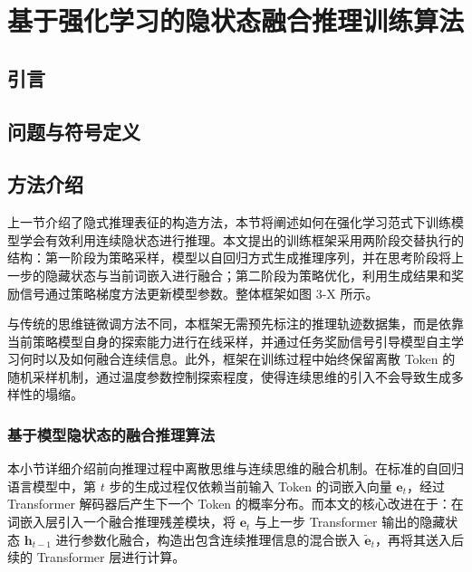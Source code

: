 \chapter{基于强化学习的隐状态融合推理训练算法}

\section{引言}


\section{问题与符号定义}


\section{方法介绍}

上一节介绍了隐式推理表征的构造方法，本节将阐述如何在强化学习范式下训练模型学会有效利用连续隐状态进行推理。本文提出的训练框架采用两阶段交替执行的结构：第一阶段为策略采样，模型以自回归方式生成推理序列，并在思考阶段将上一步的隐藏状态与当前词嵌入进行融合；第二阶段为策略优化，利用生成结果和奖励信号通过策略梯度方法更新模型参数。整体框架如图 3-X 所示。

与传统的思维链微调方法不同，本框架无需预先标注的推理轨迹数据集，而是依靠当前策略模型自身的探索能力进行在线采样，并通过任务奖励信号引导模型自主学习何时以及如何融合连续信息。此外，框架在训练过程中始终保留离散 Token 的随机采样机制，通过温度参数控制探索程度，使得连续思维的引入不会导致生成多样性的塌缩。

\subsection{基于模型隐状态的融合推理算法}

本小节详细介绍前向推理过程中离散思维与连续思维的融合机制。在标准的自回归语言模型中，第 $t$ 步的生成过程仅依赖当前输入 Token 的词嵌入向量 $\mathbf{e}_t$，经过 Transformer 解码器后产生下一个 Token 的概率分布。而本文的核心改进在于：在词嵌入层引入一个融合推理残差模块，将 $\mathbf{e}_t$ 与上一步 Transformer 输出的隐藏状态 $\mathbf{h}_{t-1}$ 进行参数化融合，构造出包含连续推理信息的混合嵌入 $\tilde{\mathbf{e}}_t$，再将其送入后续的 Transformer 层进行计算。

